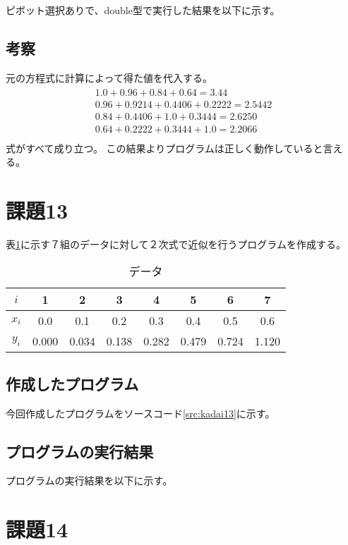 \documentclass[11pt,titlepage]{jsarticle}
\begin{document}
\begin{oframed}
\end{oframed}

ピボット選択ありで、double型で実行した結果を以下に示す。

\begin{oframed}
\end{oframed}

\subsection{考察}
元の方程式に計算によって得た値を代入する。
\begin{eqnarray}
\label{eq:gauss_pivot_result}
		\begin{array}{l}
			1.0 + 0.96 + 0.84 + 0.64 = 3.44\\
			0.96 + 0.9214 + 0.4406 + 0.2222 = 2.5442\\
			0.84 + 0.4406 + 1.0 + 0.3444 = 2.6250\\
			0.64 + 0.2222 + 0.3444 + 1.0 = 2.2066\\
		\end{array}
\end{eqnarray}
式がすべて成り立つ。
この結果よりプログラムは正しく動作していると言える。

\section{課題13}
表\ref{table:kadai13}に示す７組のデータに対して２次式で近似を行うプログラムを作成する。


\begin{table}[H]
\caption{データ}
\label{table:kadai13}
\centering
\begin{tabular}{|c|c|c|c|c|c|c|c|}\hline
	$i$&1&2&3&4&5&6&7 \\ \hline
	$x_i$&0.0&0.1&0.2&0.3&0.4&0.5&0.6 \\ \hline
	$y_i$&0.000&0.034&0.138&0.282&0.479&0.724&1.120\\ \hline
\end{tabular}
\end{table}


\subsection{作成したプログラム}
今回作成したプログラムをソースコード\ref{src:kadai13}に示す。



\subsection{プログラムの実行結果}
プログラムの実行結果を以下に示す。
\begin{oframed}
\end{oframed}

\section{課題14}
\end{document}
